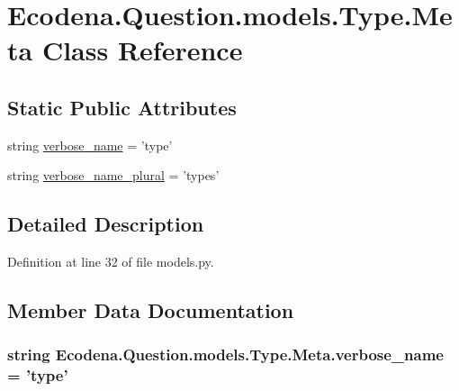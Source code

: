 \hypertarget{class_ecodena_1_1_question_1_1models_1_1_type_1_1_meta}{
\section{Ecodena.Question.models.Type.Meta Class Reference}
\label{db/d77/class_ecodena_1_1_question_1_1models_1_1_type_1_1_meta}
}
\subsection*{Static Public Attributes}
\begin{DoxyCompactItemize}
\item 
string \hyperlink{class_ecodena_1_1_question_1_1models_1_1_type_1_1_meta_a136574e864dc7276d163542c9c36308c}{verbose\_\-name} = 'type'
\item 
string \hyperlink{class_ecodena_1_1_question_1_1models_1_1_type_1_1_meta_ae1c74aca97a425904b8ee3026812fefe}{verbose\_\-name\_\-plural} = 'types'
\end{DoxyCompactItemize}


\subsection{Detailed Description}


Definition at line 32 of file models.py.



\subsection{Member Data Documentation}
\hypertarget{class_ecodena_1_1_question_1_1models_1_1_type_1_1_meta_a136574e864dc7276d163542c9c36308c}{
\subsubsection[{verbose\_\-name}]{\setlength{\rightskip}{0pt plus 5cm}string {\bf Ecodena.Question.models.Type.Meta.verbose\_\-name} = 'type'}}
\label{db/d77/class_ecodena_1_1_question_1_1models_1_1_type_1_1_meta_a136574e864dc7276d163542c9c36308c}


